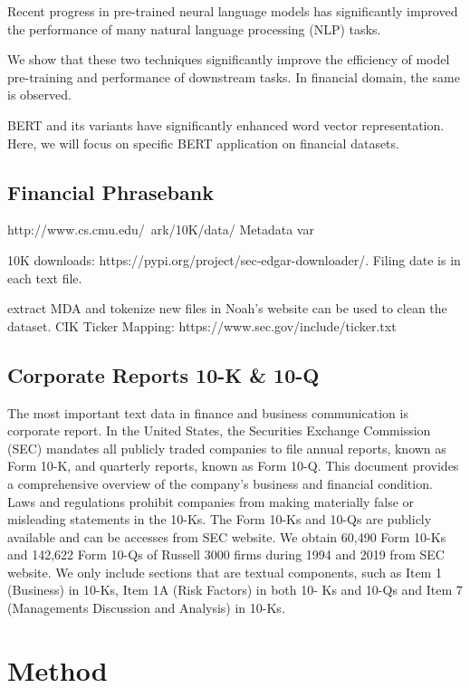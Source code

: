 \documentclass[11pt]{article}
\begin{document}
Recent progress in pre-trained neural language models has significantly improved the performance of many natural language processing (NLP) tasks.

We show that these two techniques significantly improve the efficiency of
model pre-training and performance of downstream tasks. In financial
domain, the same is observed.

BERT and its variants have significantly enhanced word vector representation. Here, we will focus on specific BERT application on financial
datasets.


\subsection{Financial Phrasebank}


http://www.cs.cmu.edu/~ark/10K/data/
Metadata var

10K downloads: https://pypi.org/project/sec-edgar-downloader/. Filing
date is in each text file.

extract MDA and tokenize new files in Noah's website can be used to clean the dataset.
CIK Ticker Mapping: https://www.sec.gov/include/ticker.txt



\subsection{Corporate Reports 10-K \& 10-Q} The most important text data in finance and business communication is corporate report. In the United States,
the Securities Exchange Commission (SEC) mandates all publicly traded companies to file annual
reports, known as Form 10-K, and quarterly reports, known as Form 10-Q. This document provides a comprehensive overview of the company’s
business and financial condition. Laws and regulations prohibit companies from making materially
false or misleading statements in the 10-Ks. The
Form 10-Ks and 10-Qs are publicly available and can be accesses from
SEC website. We obtain 60,490 Form 10-Ks and 142,622
Form 10-Qs of Russell 3000 firms during 1994 and
2019 from SEC website. We only include sections that are textual components, such as Item 1 (Business) in 10-Ks, Item 1A (Risk Factors) in both 10-
Ks and 10-Qs and Item 7 (Managements Discussion and Analysis) in 10-Ks.
\section{Method}
\end{document}
